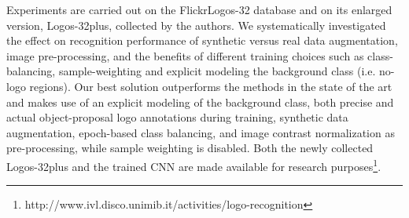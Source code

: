 \documentclass[final,5p,twocolumn]{elsarticle}
\begin{document}
Experiments are carried out on the FlickrLogos-32 database and on its enlarged version, Logos-32plus, collected by the authors. We systematically investigated the effect on recognition performance of synthetic versus real data augmentation, image pre-processing, and the benefits of different training choices such as class-balancing, sample-weighting and explicit modeling the background class (i.e. no-logo regions).
Our best solution outperforms the methods in the state of the art and makes use of an explicit modeling of the background class, both precise and actual object-proposal logo annotations during training, synthetic data augmentation, epoch-based class balancing, and image contrast normalization as pre-processing, while sample weighting is disabled. Both the newly collected Logos-32plus and the trained CNN are made available for research purposes\footnote{http://www.ivl.disco.unimib.it/activities/logo-recognition}.











\end{document}
